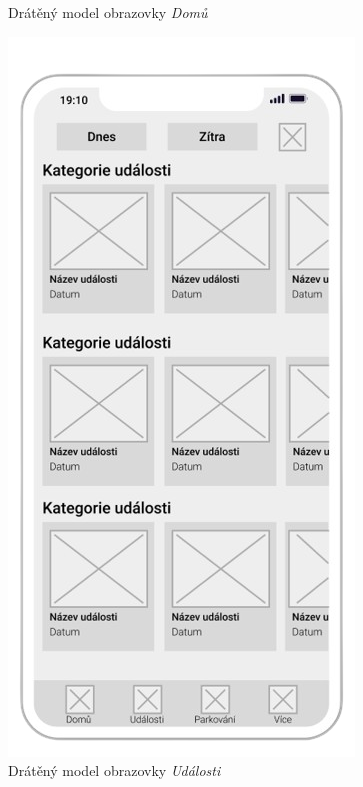 \begin{minipage}[t]{0.45\textwidth}
\begin{figure}[H]
    \caption{Drátěný model obrazovky \textit{Domů}}
    \label{fig:wireframe1}
  \end{figure}
  \begin{figure}[H]
    \centering
    \includegraphics[width=.7\textwidth]{events_wireframe.png}
    \caption{Drátěný model obrazovky \textit{Události}}
    \label{fig:wireframe2}
  \end{figure}
\end{minipage}

